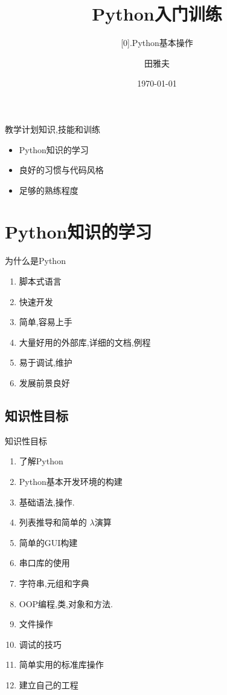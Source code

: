 \documentclass{beamer}
\begin{document}
  
\title{Python入门训练}  
\subtitle{[0].Python基本操作}
\author{田雅夫}
\date{\today}
\frame{\titlepage}  
    \begin{frame} {教学计划}{知识,技能和训练}

    \begin{itemize}  
    \item Python知识的学习  
    \item 良好的习惯与代码风格
    \item 足够的熟练程度 
	\end{itemize}  
	\end{frame}  
\section{Python知识的学习}


\begin{frame}{为什么是Python}
\begin{enumerate}
\item 脚本式语言
\item 快速开发
\item 简单,容易上手
\item 大量好用的外部库,详细的文档,例程
\item 易于调试,维护
\item 发展前景良好

\end{enumerate}

\end{frame}


\subsection{知识性目标}
\begin{frame}{知识性目标}
\begin{enumerate}
\item 了解Python
\item Python基本开发环境的构建
\item 基础语法,操作.
\item 列表推导和简单的 $\lambda$演算
\item 简单的GUI构建
\item 串口库的使用
\item 字符串,元组和字典
\item OOP编程,类,对象和方法.
\item 文件操作
\item 调试的技巧
\item 简单实用的标准库操作
\item 建立自己的工程
\end{enumerate}
\end{frame}
\end{document}
